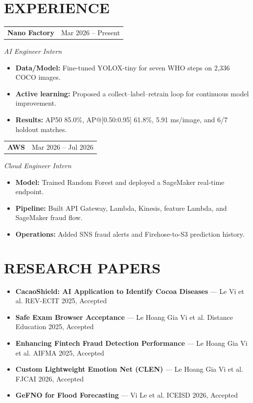 \documentclass[10pt,letterpaper]{article}
\makeatletter
\newcommand{\cvsection}[2]{\section*{\faIcon{#1}\hspace{0.45em}#2}}
\newcommand{\cvjobentry}[3]{%
  \begin{tabularx}{\textwidth}{@{}X>{\raggedleft\arraybackslash}p{1.52in}@{}}
    \textbf{#1} & \normalsize #2 \\
  \end{tabularx}\par
  \vspace{0.10em}\normalsize\textit{#3}\par\vspace{0.08em}
}
\newcommand{\paperentry}[3]{%
  \item \small \textbf{#1} --- #2 \hfill #3
}
\makeatother
\begin{document}
\cvsection{briefcase}{EXPERIENCE}
\cvjobentry{Nano Factory}{Mar 2026 -- Present}{AI Engineer Intern}
\begin{itemize}[leftmargin=1.75em,itemsep=0.10em,topsep=0.16em]
  \item \normalsize \textbf{Data/Model:} Fine-tuned YOLOX-tiny for seven WHO steps on 2,336 COCO images.
  \item \normalsize \textbf{Active learning:} Proposed a collect--label--retrain loop for continuous model improvement.
  \item \normalsize \textbf{Results:} AP50 85.0\%, AP@[0.50:0.95] 61.8\%, 5.91 ms/image, and 6/7 holdout matches.
\end{itemize}
\vspace{0.45em}
\cvjobentry{AWS}{Mar 2026 -- Jul 2026}{Cloud Engineer Intern}
\begin{itemize}[leftmargin=1.75em,itemsep=0.10em,topsep=0.16em]
  \item \normalsize \textbf{Model:} Trained Random Forest and deployed a SageMaker real-time endpoint.
  \item \normalsize \textbf{Pipeline:} Built API Gateway, Lambda, Kinesis, feature Lambda, and SageMaker fraud flow.
  \item \normalsize \textbf{Operations:} Added SNS fraud alerts and Firehose-to-S3 prediction history.
\end{itemize}

\cvsection{book}{RESEARCH PAPERS}
\begin{itemize}[leftmargin=1.45em,itemsep=0em,topsep=0em,parsep=0em,partopsep=0em]
  \paperentry{CacaoShield: AI Application to Identify Cocoa Diseases}{Le Vi et al.}{REV-ECIT 2025, Accepted}
  \paperentry{Safe Exam Browser Acceptance}{Le Hoang Gia Vi et al.}{Distance Education 2025, Accepted}
  \paperentry{Enhancing Fintech Fraud Detection Performance}{Le Hoang Gia Vi et al.}{AIFMA 2025, Accepted}
  \paperentry{Custom Lightweight Emotion Net (CLEN)}{Le Hoang Gia Vi et al.}{FJCAI 2026, Accepted}
  \paperentry{GeFNO for Flood Forecasting}{Vi Le et al.}{ICEISD 2026, Accepted}
\end{itemize}
\end{document}
